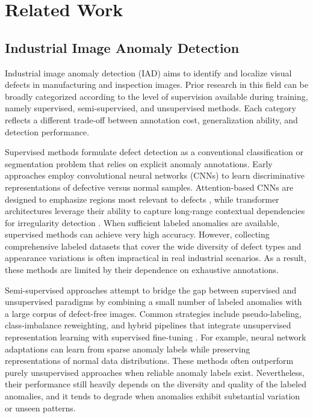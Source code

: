 \section{Related Work}
\label{sec:relatedwork}

\subsection{Industrial Image Anomaly Detection}

Industrial image anomaly detection (IAD) aims to identify and localize visual defects in manufacturing and inspection images. Prior research in this field can be broadly categorized according to the level of supervision available during training, namely supervised, semi-supervised, and unsupervised methods. Each category reflects a different trade-off between annotation cost, generalization ability, and detection performance.

Supervised methods formulate defect detection as a conventional classification or segmentation problem that relies on explicit anomaly annotations. Early approaches employ convolutional neural networks (CNNs) to learn discriminative representations of defective versus normal samples. Attention-based CNNs are designed to emphasize regions most relevant to defects \cite{venkataramanan2020attention}, while transformer architectures leverage their ability to capture long-range contextual dependencies for irregularity detection \cite{ding2022catching}. When sufficient labeled anomalies are available, supervised methods can achieve very high accuracy. However, collecting comprehensive labeled datasets that cover the wide diversity of defect types and appearance variations is often impractical in real industrial scenarios. As a result, these methods are limited by their dependence on exhaustive annotations.

Semi-supervised approaches attempt to bridge the gap between supervised and unsupervised paradigms by combining a small number of labeled anomalies with a large corpus of defect-free images. Common strategies include pseudo-labeling, class-imbalance reweighting, and hybrid pipelines that integrate unsupervised representation learning with supervised fine-tuning \cite{chadha2019comparison, chu2020neural}. For example, neural network adaptations can learn from sparse anomaly labels while preserving representations of normal data distributions. These methods often outperform purely unsupervised approaches when reliable anomaly labels exist. Nevertheless, their performance still heavily depends on the diversity and quality of the labeled anomalies, and it tends to degrade when anomalies exhibit substantial variation or unseen patterns.

